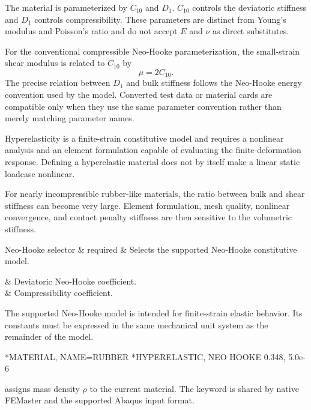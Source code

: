 The material is parameterized by \(C_{10}\) and \(D_1\). \(C_{10}\) controls the deviatoric stiffness and \(D_1\) controls compressibility. These parameters are distinct from Young's modulus and Poisson's ratio and do not accept \(E\) and \(\nu\) as direct substitutes.

For the conventional compressible Neo-Hooke parameterization, the small-strain shear modulus is related to \(C_{10}\) by
\[
\mu=2C_{10}.
\]
The precise relation between \(D_1\) and bulk stiffness follows the Neo-Hooke energy convention used by the model. Converted test data or material cards are compatible only when they use the same parameter convention rather than merely matching parameter names.

Hyperelasticity is a finite-strain constitutive model and requires a nonlinear analysis and an element formulation capable of evaluating the finite-deformation response. Defining a hyperelastic material does not by itself make a linear static loadcase nonlinear.

For nearly incompressible rubber-like materials, the ratio between bulk and shear stiffness can become very large. Element formulation, mesh quality, nonlinear convergence, and contact penalty stiffness are then sensitive to the volumetric stiffness.

\begin{keywordparameters}
Neo-Hooke selector & required & Selects the supported Neo-Hooke constitutive model. \\
\end{keywordparameters}

\begin{keyworddata}
 & Deviatoric Neo-Hooke coefficient. \\
 & Compressibility coefficient. \\
\end{keyworddata}

The supported Neo-Hooke model is intended for finite-strain elastic behavior. Its constants must be expressed in the same mechanical unit system as the remainder of the model.

\exampleheading

\begin{inputdeck}
*MATERIAL, NAME=RUBBER
*HYPERELASTIC, NEO HOOKE
0.348, 5.0e-6
\end{inputdeck}


 assigns mass density \(\rho\) to the current material. The keyword is shared by native FEMaster and the supported Abaqus input format.

